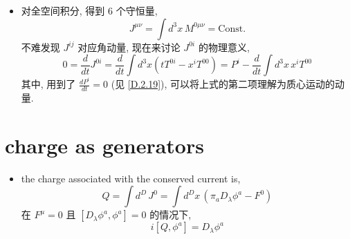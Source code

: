 \begin{itemize}
	\noindent\hdashrule[0.5ex]{\linewidth}{0.5pt}{1mm} %
	
	\item 对全空间积分, 得到 6 个守恒量,
	\begin{equation}
		J^{\mu \nu} = \int d^3 x \, M^{0 \mu \nu} = \text{Const.}
	\end{equation}
	不难发现 $J^{i j}$ 对应角动量, 现在来讨论 $J^{0 i}$ 的物理意义,
	\begin{equation}
		0 = \frac{d}{dt} J^{0 i} = \frac{d}{dt} \int d^3 x (t T^{0 i} - x^i T^{0 0}) = P^i - \frac{d}{dt} \int d^3 x \, x^i T^{0 0}
	\end{equation}
	其中, 用到了 $\frac{d P^i}{dt} = 0$ (见 \eqref{D.2.19}), 可以将上式的第二项理解为质心运动的动量.
\end{itemize}

\section{charge as generators}
\begin{itemize}
	\item the charge associated with the conserved current is,
	\begin{equation}
		Q = \int d^D \, J^0 = \int d^D x \, (\pi_a D_\lambda \phi^a - F^0)
	\end{equation}
	在 $F^\mu = 0$ 且 $[D_\lambda \phi^a, \phi^a] = 0$ 的情况下,
	\begin{equation} \label{D.3.2}
		i [Q, \phi^a] = D_\lambda \phi^a
	\end{equation}
\end{itemize}

